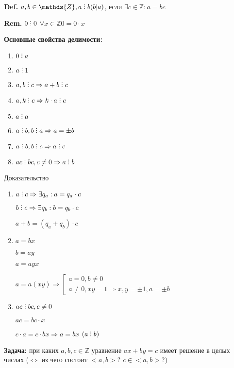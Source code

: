 \documentclass[14pt, letter paper]{article}
\DeclareRobustCommand{\divby}{%
  \mathrel{\text{\vbox{\baselineskip.65ex\lineskiplimit0pt\hbox{.}\hbox{.}\hbox{.}}}}%
}
\begin{document}
\textbf{Def.} $a, b \in \mathds{Z}, a \divby b (b | a)$, если $\exists c \in \mathds{Z}: a = bc$

\textbf{Rem.} $0 \divby 0$ $\forall x \in \mathds{Z} 0 = 0 \cdot x$

\textbf{Основные свойства делимости:}
\begin{enumerate}
    \item $0 \divby a$
    \item $a \divby 1$
    \item $a, b \divby c \Rightarrow a + b \divby c$
    \item $a, k \divby c \Rightarrow k \cdot a \divby c$
    \item $a \divby a$
    \item $a \divby b, b \divby a \Rightarrow a = \pm b$
    \item $a \divby b, b \divby c \Rightarrow a \divby c$
    \item $ac \divby bc, c \neq 0 \Rightarrow a \divby b$
\end{enumerate}

\begin{center}
    Доказательство
\end{center}

\begin{enumerate}
    \item[3.] $a \divby c \Rightarrow \exists q_a: a = q_a \cdot c$

    $b \divby c \Rightarrow \exists q_b: b = q_b \cdot c$

    $a + b = (q_a + q_b) \cdot c$

    \item[6.] $a = bx$

    $b = ay$

    $a = ayx$

    $a = a(xy) \Rightarrow \left[ \begin{gathered} a = 0, b \neq 0 \\ a \neq 0, xy = 1 \Rightarrow x, y = \pm 1, a = \pm b \end{gathered} \right.$

    \item[8.] $ac \divby bc, c \neq 0$ 
    
    $ac = bc \cdot x$

    $c \cdot a = c \cdot bx \Rightarrow a = bx$ $(a \divby b)$
\end{enumerate}

\textbf{Задача:} при каких $a, b, c \in \mathds{Z}$ уравнение $ax + by = c$ имеет решение в целых числах ($\Leftrightarrow$ из чего состоит $<a, b>$? $c \in <a, b>$?)
\end{document}
